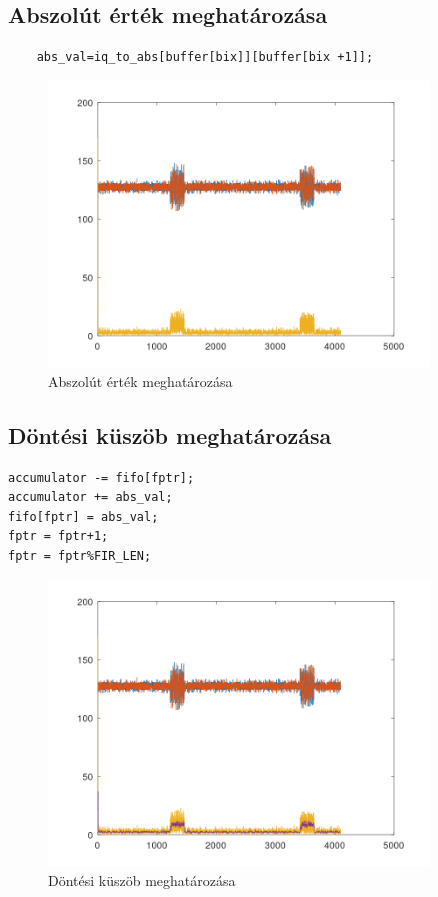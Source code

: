 \subsection{Abszolút érték meghatározása}
\begin{lstlisting}
    abs_val=iq_to_abs[buffer[bix]][buffer[bix +1]];
\end{lstlisting}
\begin{figure}[h]
    \centering
    \includegraphics[width=0.9\textwidth]{../meres/result/abs_value.png}
    \caption{Abszolút érték meghatározása}
    \label{fig:abs}
\end{figure}

\newpage
\subsection{Döntési küszöb meghatározása}
\begin{lstlisting}
accumulator -= fifo[fptr];
accumulator += abs_val;
fifo[fptr] = abs_val;
fptr = fptr+1;
fptr = fptr%FIR_LEN;
\end{lstlisting}
\begin{figure}[h]
    \centering
    \includegraphics[width=0.9\textwidth]{../meres/result/dontes.png}
    \caption{Döntési küszöb meghatározása}
    \label{fig:deceison}
\end{figure}

